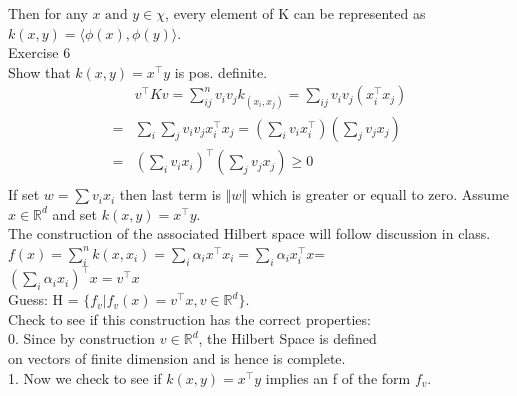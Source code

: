 \documentclass[18pt]{article}
\begin{document}
\begin{flushleft}
Then for any $x \text{ and } y \in \chi$, every element of K can be represented as\\
$k(x,y)=\langle \phi(x),\phi(y)\rangle$.\\
\vspace{.5cm}
Exercise 6
\\
Show that $k(x,y)=x^{\top}y$ is pos. definite.\\

$$
\begin{aligned}
  &v^{\top} K v=\sum_{i j}^n v_{i} v_{j} k_(x_i,x_j)=\sum_{i j} v_{i} v_{j}\left(x_{i}^{\top} x_{j}\right) \\
= & \sum_{i} \sum_{j} v_{i} v_{j} x_{i}^{\top} x_{j} = \left(\sum_{i} v_{i} x_{i}^{\top}\right)\left(\sum_{j} v_{j} x_{j}\right) \\
= & \left(\sum_{i} v_{i} x_{i}\right)^{\top}\left(\sum_{j} v_{j} x_{j}\right)  \geqslant 0\\
\end{aligned}
$$
\vspace{.4cm}
If set $w=\sum v_i x_i$ then last term is $\Vert w\Vert$  which is greater or equall to zero.
Assume $x\in\mathbb{R}^d$ and set $k(x,y)=x^{\top}y$.\\
\vspace{.4cm}
The construction of the associated Hilbert space will follow discussion in class.\\
\vspace{.4cm}
$f(x)=\sum_i^n k(x,x_i)=\sum_i \alpha_i x^{\top}x_i=\sum_i\alpha_ix_i^{\top}x$=\\
\vspace{.4cm}
$\left(\sum_i\alpha_i x_i\right)^{\top}x=v^{\top}x$\\
\vspace{.4cm}
Guess: H = $\{f_v | f_v(x)=v^{\top}x, v \in \mathbb{R}^d\}$.\\
\vspace{.4cm}
Check to see if this construction has the correct properties:\\
\vspace{.4cm}
0. Since by construction $v \in\mathbb{R}^d$, the Hilbert Space is defined\\
on vectors of finite dimension and is hence is complete.\\
\vspace{.4cm}
1. Now we check to see if $k(x,y)=x^{\top}y$ implies an f of the form $f_v$.\\
\vspace{.4cm}

\end{flushleft}
\end{document}
